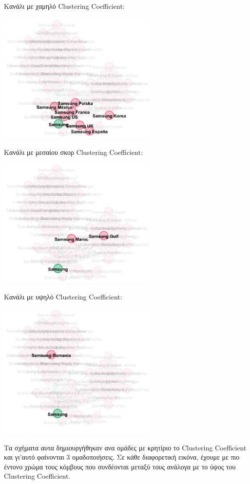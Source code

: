 \documentclass[12pt]{article}
\begin{document}
	\newpage
	Κανάλι με χαμηλό Clustering Coefficient:
	\begin{center}
		\includegraphics[width=0.6\textwidth]{photos-files/section8/mikro.png}
	\end{center}
	\par
	Κανάλι με μεσαίου σκορ Clustering Coefficient:
	\begin{center}
		\includegraphics[width=0.6\textwidth]{photos-files/section8/meseo.png}
	\end{center}
	\newpage
	Κανάλι με υψηλό Clustering Coefficient:
	\begin{center}
		\includegraphics[width=0.6\textwidth]{photos-files/section8/megalo.png}
	\end{center}
	Τα σχήματα αυτα δημιουργήθηκαν ανα ομάδες με κρητίριο το Clustering Coefficient και γι'αυτό φαίνονται 3 ομαδοποιήσεις. Σε κάθε διαφορετική εικόνα, έχουμε με πιο έντονο χρώμα τους κόμβους που συνδέονται μεταξύ τους ανάλογα με το ύψος του Clustering Coefficient.
	
\end{document}
